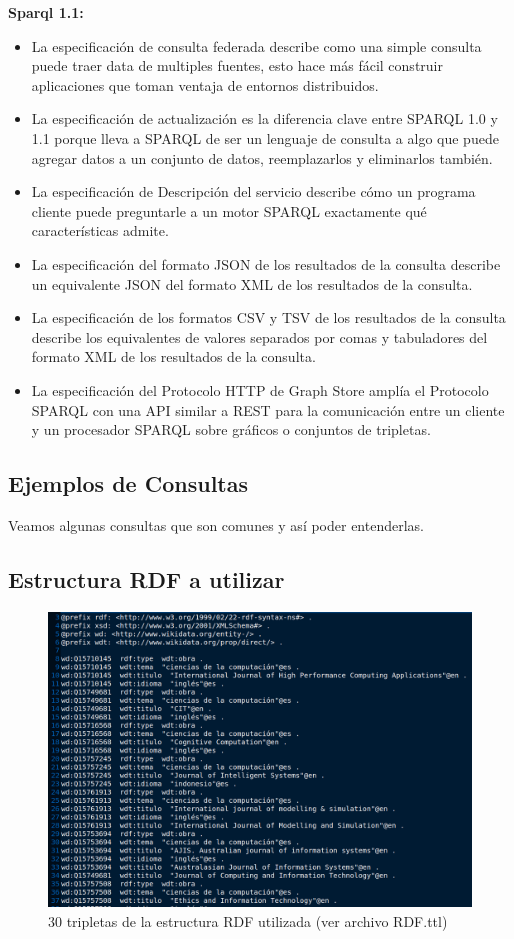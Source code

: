 \documentclass[conference]{IEEEtran}
\begin{document}
\textbf{Sparql 1.1:}
\begin{itemize}
	\item La especificación de consulta federada describe como una simple consulta puede traer data de multiples fuentes, esto hace más fácil construir aplicaciones que toman ventaja de entornos distribuidos.
	\item La especificación de actualización es la diferencia clave entre SPARQL 1.0 y 1.1 porque lleva a SPARQL de ser un lenguaje de consulta a algo que puede agregar datos a un conjunto de datos, reemplazarlos y eliminarlos también.
	\item La especificación de Descripción del servicio describe cómo un programa cliente puede preguntarle a un motor SPARQL exactamente qué características admite.
	\item La especificación del formato JSON de los resultados de la consulta describe un equivalente JSON del formato XML de los resultados de la consulta.
	\item La especificación de los formatos CSV y TSV de los resultados de la consulta describe los equivalentes de valores separados por comas y tabuladores del formato XML de los resultados de la consulta.
	\item La especificación del Protocolo HTTP de Graph Store amplía el Protocolo SPARQL con una API similar a REST para la comunicación entre un cliente y un procesador SPARQL sobre gráficos o conjuntos de tripletas.  \cite{b4}
	
\end{itemize}

\subsection{Ejemplos de Consultas}
Veamos algunas consultas que son comunes y así poder entenderlas.
\subsection{Estructura RDF a utilizar}

\begin{figure}[H]
\includegraphics[scale=0.2]{imagenes/estruc_rdf_30.png} 
\caption{30 tripletas de la estructura RDF utilizada (ver archivo RDF.ttl) }
\end{figure} 
\end{document}
